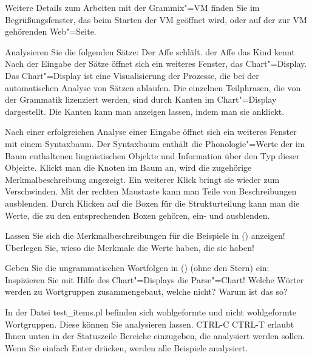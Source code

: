 {\begin{enumerate}
      Weitere Details zum Arbeiten mit der Grammix"=VM finden Sie im Begrüßungsfenster,
      das beim Starten der VM geöffnet wird, oder auf der zur VM gehörenden Web"=Seite.

      Analysieren Sie die folgenden Sätze:
      \eal
      \ex Der Affe schläft.
      \ex der Affe das Kind kennt
      \zl
      Nach der Eingabe der Sätze öffnet sich ein weiteres Fenster, das Chart"=Display.
      Das Chart"=Display ist eine Visualisierung der Prozesse, die bei der automatischen
      Analyse von Sätzen ablaufen. Die einzelnen Teilphrasen, die von der
      Grammatik lizenziert werden, sind durch Kanten im Chart"=Display dargestellt. Die Kanten
      kann man anzeigen lassen, indem man sie anklickt.

      Nach einer erfolgreichen Analyse einer Eingabe öffnet sich ein weiteres Fenster mit einem
      Syntaxbaum. Der Syntaxbaum enthält die Phonologie"=Werte der im Baum enthaltenen
      linguistischen Objekte und Information über den Typ dieser Objekte.
      Klickt man die Knoten im Baum an, wird die zugehörige Merkmalbeschreibung
      angezeigt. Ein weiterer Klick bringt sie wieder zum Verschwinden. Mit der rechten Maustaste
      kann man Teile von Beschreibungen ausblenden. Durch Klicken auf die Boxen für die Strukturteilung
      kann man die Werte, die zu den entsprechenden Boxen gehören, ein- und ausblenden.

      Lassen Sie sich die Merkmalbeschreibungen für die Beispiele in () anzeigen!
      Überlegen Sie, wieso die Merkmale die Werte haben, die sie haben!\pagebreak
      
      Geben Sie die ungrammatischen Wortfolgen in () (ohne den Stern) ein:
      \eal
      \zl
      Inspizieren Sie mit Hilfe des Chart"=Displays die Parse"=Chart! Welche Wörter
      werden zu Wortgruppen zusammengebaut, welche nicht? Warum ist das so?

      In der Datei test\_items.pl befinden sich wohlgeformte und nicht wohlgeformte
      Wortgruppen. Diese können Sie analysieren lassen. CTRL-C CTRL-T erlaubt Ihnen unten in der
      Statuszeile Bereiche einzugeben, die analysiert werden sollen. Wenn Sie einfach Enter drücken,
      werden alle Beispiele analysiert.
\end{enumerate}
}
